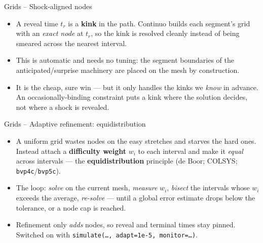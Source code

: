 \documentclass[11pt,aspectratio=169]{beamer}
\begin{document}
\begin{frame}{Grids -- Shock-aligned nodes}

\begin{itemize}

\item A reveal time $t_r$ is a \textbf{kink} in the path. Continuo builds
  each segment's grid with an \emph{exact node} at $t_r$, so the kink is
  resolved cleanly instead of being smeared across the nearest
  interval.\newline

\item This is automatic and needs no tuning: the segment boundaries of
  the anticipated/surprise machinery are placed on the mesh by
  construction.\newline

\item It is the cheap, sure win — but it only handles the kinks we
  \emph{know} in advance. An occasionally-binding constraint puts a kink
  where the solution decides, not where a shock is revealed.

\end{itemize}

\end{frame}

\begin{frame}{Grids -- Adaptive refinement: equidistribution}

\begin{itemize}

\item A uniform grid wastes nodes on the easy stretches and starves the
  hard ones. Instead attach a \textbf{difficulty weight} $w_i$ to each
  interval and make it \emph{equal} across intervals — the
  \textbf{equidistribution} principle (de Boor; COLSYS;
  \texttt{bvp4c}/\texttt{bvp5c}).\newline

\item The loop: \emph{solve} on the current mesh, \emph{measure} $w_i$,
  \emph{bisect} the intervals whose $w_i$ exceeds the average,
  \emph{re-solve} — until a global error estimate drops below the
  tolerance, or a node cap is reached.\newline

\item Refinement only \emph{adds} nodes, so reveal and terminal times stay
  pinned. Switched on with \texttt{simulate(\ldots, adapt=1e-5, monitor=\ldots)}.

\end{itemize}

\end{frame}
\end{document}
